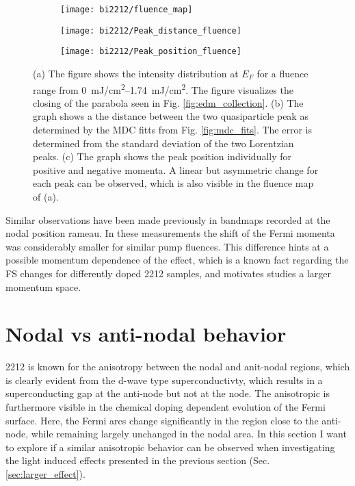\begin{figure}[t]
	\centering
	\begin{subfigure}[b]{0.25\textwidth}
		\texttt{[image: bi2212/fluence\_map]}
		\caption{}
	\end{subfigure}
	\begin{subfigure}[b]{0.35\textwidth}
		\texttt{[image: bi2212/Peak\_distance\_fluence]}
		\caption{}
	\end{subfigure}
	\begin{subfigure}[b]{0.35\textwidth}
		\texttt{[image: bi2212/Peak\_position\_fluence]}
		\caption{}
	\end{subfigure}
	\caption{(a) The figure shows the intensity distribution at $E_F$ for a fluence range from \qtyrange{0}{1.74}{\milli\joule/\centi\meter\squared}. The figure visualizes the closing of the parabola seen in Fig. \ref{fig:edm_collection}. (b) The graph shows a the distance between the two quasiparticle peak as determined by the MDC fitts from Fig. \ref{fig:mdc_fits}. The error is determined from the standard deviation of the two Lorentzian peaks. (c) The graph shows the peak position individually for positive and negative momenta. A linear but asymmetric change for each peak can be observed, which is also visible in the fluence map of (a).}
	\label{fig:fluence_map}
\end{figure}

Similar observations have been made previously in bandmaps recorded at the nodal position \cite{bibid} rameau.
In these measurements the shift of the Fermi momenta was considerably smaller for similar pump fluences.
This difference hints at a possible momentum dependence of the effect, which is a known fact regarding the FS changes for differently doped 2212 samples, and motivates studies a larger momentum space.

\section{Nodal vs anti-nodal behavior}
\label{sec:angle}

2212 is known for the anisotropy between the nodal and anit-nodal regions, which is clearly evident from the d-wave type superconductivty, which results in a superconducting gap at the anti-node but not at the node.
The anisotropic is furthermore visible in the chemical doping dependent evolution of the Fermi surface.
Here, the Fermi arcs change significantly in the region close to the anti-node, while remaining largely unchanged in the nodal area.
In this section I want to explore if a similar anisotropic behavior can be observed when investigating the light induced effects presented in the previous section (Sec. \ref{sec:larger_effect}).

